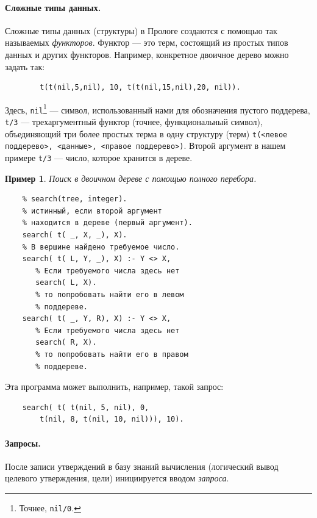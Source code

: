 \documentclass[12pt, openany, twoside]{book} %
\newtheorem{example}{Пример}[chapter]
\begin{document}
\paragraph{Сложные типы данных.}\label{sec:complex_data}
Сложные типы данных (структуры) в Прологе создаются с помощью так называемых {\em функторов}. Функтор --- это терм, состоящий из простых типов данных и других функторов. Например, конкретное двоичное дерево можно задать так:
{\tt\begin{verbatim}
        t(t(nil,5,nil), 10, t(t(nil,15,nil),20, nil)).
\end{verbatim}}
Здесь, \texttt{nil}\footnote{Точнее, \texttt{nil/0}.} --- символ, использованный нами для обозначения пустого поддерева, \texttt{t/3} --- трехаргументный функтор (точнее, функциональный символ), объединяющий три более простых терма в одну структуру (терм) \texttt{t(<левое поддерево>, <данные>, <правое поддерево>)}. Второй аргумент в нашем примере \texttt{t/3} --- число, которое хранится в дереве.

\begin{example} Поиск в двоичном дереве с помощью полного перебора.
\label{ex:treesearch}
\end{example}
{\tt\begin{verbatim}
    % search(tree, integer).
    % истинный, если второй аргумент
    % находится в дереве (первый аргумент).
    search( t( _, X, _), X).
    % В вершине найдено требуемое число.
    search( t( L, Y, _), X) :- Y <> X,
       % Если требуемого числа здесь нет
       search( L, X).
       % то попробовать найти его в левом
       % поддереве.
    search( t( _, Y, R), X) :- Y <> X,
       % Если требуемого числа здесь нет
       search( R, X).
       % то попробовать найти его в правом
       % поддереве.
\end{verbatim}}
\noindent Эта программа может выполнить, например, такой запрос:
{\tt\begin{verbatim}
    search( t( t(nil, 5, nil), 0,
        t(nil, 8, t(nil, 10, nil))), 10).
\end{verbatim}}

\paragraph{Запросы.} После записи утверждений в базу знаний вычисления (логический вывод целевого утверждения, цели) инициируется вводом \emph{запроса}.
\end{document}

